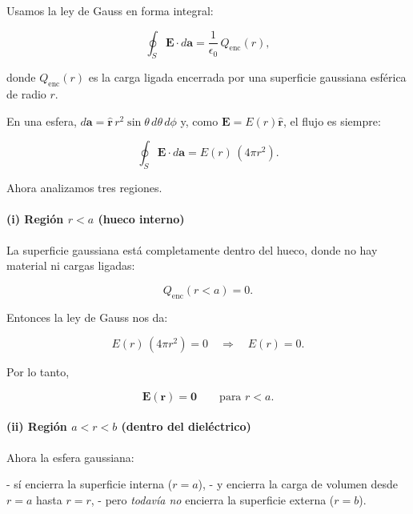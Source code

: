 \documentclass{article}
\begin{document}
Usamos la ley de Gauss en forma integral:

\begin{equation}
\oint_{S} \mathbf{E}\cdot d\mathbf{a}
= \frac{1}{\epsilon_{0}}\,Q_{\text{enc}}(r),
\label{eq:gauss-shell}
\end{equation}

donde $Q_{\text{enc}}(r)$ es la carga ligada encerrada por una superficie
gaussiana esférica de radio $r$.

En una esfera, $d\mathbf{a} = \hat{\mathbf{r}}\,r^{2}\sin\theta\,d\theta\,d\phi$
y, como $\mathbf{E} = E(r)\hat{\mathbf{r}}$, el flujo es siempre:

\[
\oint_{S} \mathbf{E}\cdot d\mathbf{a} = E(r)\,(4\pi r^{2}).
\]

Ahora analizamos tres regiones.

\paragraph{(i) Región $r<a$ (hueco interno)}

La superficie gaussiana está completamente dentro del hueco, donde no hay
material ni cargas ligadas:

\begin{equation}
Q_{\text{enc}}(r<a) = 0.
\label{eq:Qenc-inner}
\end{equation}

Entonces la ley de Gauss nos da:

\[
E(r)\,(4\pi r^{2}) = 0
\quad\Rightarrow\quad
E(r)=0.
\]

Por lo tanto,

\begin{equation}
\mathbf{E}(\mathbf{r}) = \mathbf{0}
\qquad \text{para } r<a.
\label{eq:E-inner-final}
\end{equation}

\paragraph{(ii) Región $a<r<b$ (dentro del dieléctrico)}

Ahora la esfera gaussiana:

- sí encierra la superficie interna ($r=a$),  
- y encierra la carga de volumen desde $r=a$ hasta $r=r$,  
- pero \emph{todavía no} encierra la superficie externa ($r=b$).
\end{document}
